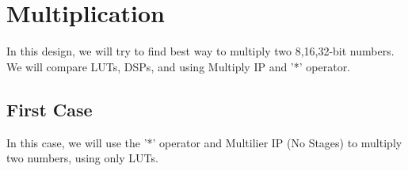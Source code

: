 \documentclass{report}
\begin{document}



\section{Multiplication}
In this design, we will try to find best way to multiply two 8,16,32-bit numbers. We will compare LUTs, DSPs, and using Multiply IP and '*' operator.

\subsection{First Case}
In this case, we will use the '*' operator and Multilier IP (No Stages) to multiply two numbers, using only LUTs.
\end{document}
